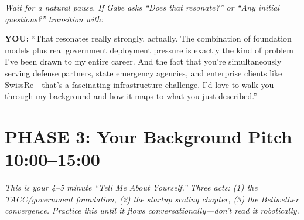 \documentclass[11pt,letterpaper]{article}
\newenvironment{you}{\begin{mdframed}[backgroundcolor=youbg,linewidth=0pt,innertopmargin=8pt,innerbottommargin=8pt]\textbf{\color{xblue}YOU:} }{\end{mdframed}}
\newcommand{\stage}[1]{{\small\color{xgray}\textit{#1}}}
\begin{document}
\stage{Wait for a natural pause. If Gabe asks ``Does that resonate?'' or ``Any initial questions?'' transition with:}

\begin{you}
``That resonates really strongly, actually. The combination of foundation models plus real government deployment pressure is exactly the kind of problem I've been drawn to my entire career. And the fact that you're simultaneously serving defense partners, state emergency agencies, and enterprise clients like SwissRe---that's a fascinating infrastructure challenge. I'd love to walk you through my background and how it maps to what you just described.''
\end{you}

\section*{PHASE 3: Your Background Pitch \hfill {\color{xgray}\normalsize 10:00--15:00}}

\stage{This is your 4--5 minute ``Tell Me About Yourself.'' Three acts: (1) the TACC/government foundation, (2) the startup scaling chapter, (3) the Bellwether convergence. Practice this until it flows conversationally---don't read it robotically.}
\end{document}
